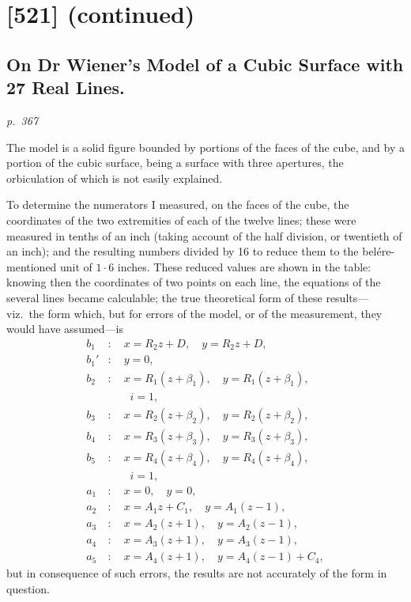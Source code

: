 \documentclass[11pt,a4paper]{article}
\theoremstyle{plain}
\theoremstyle{definition}
\begin{document}
\section*{[521] (continued)}
\subsection*{On Dr Wiener's Model of a Cubic Surface with 27 Real Lines.}

\textit{p.~367}

\noindent
The model is a solid figure bounded by portions of the faces of the cube, and
by a portion of the cubic surface, being a surface with three apertures, the orbiculation
of which is not easily explained.

To determine the numerators I measured, on the faces of the cube, the coordinates
of the two extremities of each of the twelve lines; these were measured in tenths
of an inch (taking account of the half division, or twentieth of an inch); and the
resulting numbers divided by 16 to reduce them to the bel\'ere-mentioned unit of $1\cdot 6$
inches.  These reduced values are shown in the table: knowing then the coordinates
of two points on each line, the equations of the several lines became calculable; the
true theoretical form of these results---viz.\ the form which, but for errors of the
model, or of the measurement, they would have assumed---is
\begin{align*}
b_1 &: \quad x = R_2 z + D, \quad y = R_2 z + D, \\
b_1' &: \quad y = 0, \\
b_2 &: \quad x = R_1 (z + \beta_1), \quad y = R_1 (z + \beta_1), \\
&\qquad i = 1, \\
b_3 &: \quad x = R_2 (z + \beta_2), \quad y = R_2 (z + \beta_2), \\
b_4 &: \quad x = R_3 (z + \beta_3), \quad y = R_3 (z + \beta_3), \\
b_5 &: \quad x = R_4 (z + \beta_4), \quad y = R_4 (z + \beta_4), \\
&\qquad i = 1, \\
a_1 &: \quad x = 0, \quad y = 0, \\
a_2 &: \quad x = A_1 z + C_1, \quad y = A_1 (z - 1), \\
a_3 &: \quad x = A_2 (z + 1), \quad y = A_2 (z - 1), \\
a_4 &: \quad x = A_3 (z + 1), \quad y = A_3 (z - 1), \\
a_5 &: \quad x = A_4 (z + 1), \quad y = A_4 (z - 1) + C_4,
\end{align*}
but in consequence of such errors, the results are not accurately of the form in question.
\end{document}
